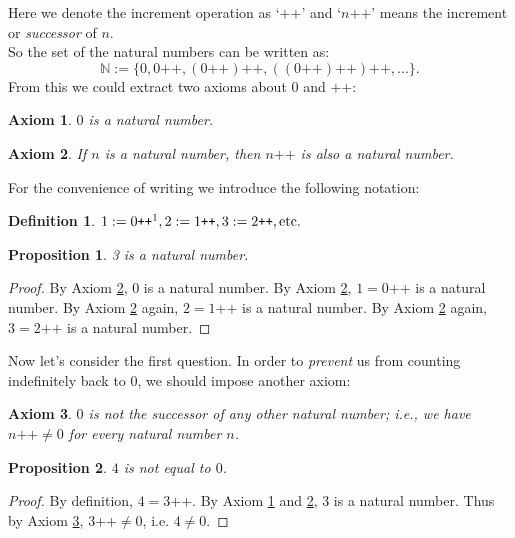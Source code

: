 \documentclass[a4paper]{book}
\newtheorem*{proof}{\textit{Proof.}}
\newtheorem{definition}{Definition}[section]
\newtheorem{axiom}{Axiom}[chapter]
\newtheorem{proposition}{Proposition}[section]
\begin{document}
			Here we denote the increment operation as `$\texttt{++}$' and `$n\texttt{++}$' means the increment or \textit{successor} of $n$.\\
			So the set of the natural numbers can be written as:
			\begin{equation*}
				\mathbb{N} := \{0,0\texttt{++},(0\texttt{++})\texttt{++},((0\texttt{++})\texttt{++})\texttt{++},...\}.
			\end{equation*}
			From this we could extract two axioms about $0$ and $\texttt{++}$:
			\begin{axiom}
				\label{ax:peano1}
				$0$ is a natural number.
			\end{axiom}
			\begin{axiom}
				\label{ax:peano2}
				If $n$ is a natural number, then $n\texttt{++}$ is also a natural number.
			\end{axiom}
			For the convenience of writing we introduce the following notation:
			\begin{definition}
				$1 :=0\texttt{++}\footnotemark, 2 :=1\texttt{++}, 3 :=2\texttt{++}, \mathrm{etc.}$ 
			\end{definition}
			\begin{proposition}
				3 is a natural number.
			\end{proposition}
			\begin{proof}
				By Axiom \ref{ax:peano2}, $0$ is a natural number. By Axiom \ref{ax:peano2}, $1 = 0\texttt{++}$ is a natural number. By Axiom \ref{ax:peano2} again, $2 = 1\texttt{++}$ is a natural number. By Axiom \ref{ax:peano2} again, $3 = 2\texttt{++}$ is a natural number.
			\end{proof}
			Now let's consider the first question. In order to \textit{prevent} us from counting indefinitely back to $0$, we should impose another axiom:
			\begin{axiom}
				\label{ax:peano3}
				$0$ is not the successor of any other natural number; i.e., we have $n\texttt{++} \neq 0$ for every natural number $n$.
			\end{axiom}
			\begin{proposition}
				\label{pro:4<>0}
				$4$ is not equal to $0$.
			\end{proposition}
			\begin{proof}
				By definition, $4=3\texttt{++}$. By Axiom \ref{ax:peano1} and \ref{ax:peano2}, 3 is a natural number. Thus by Axiom \ref{ax:peano3}, $3\texttt{++} \neq 0$, i.e. $4 \neq 0$.
			\end{proof}
\end{document}
